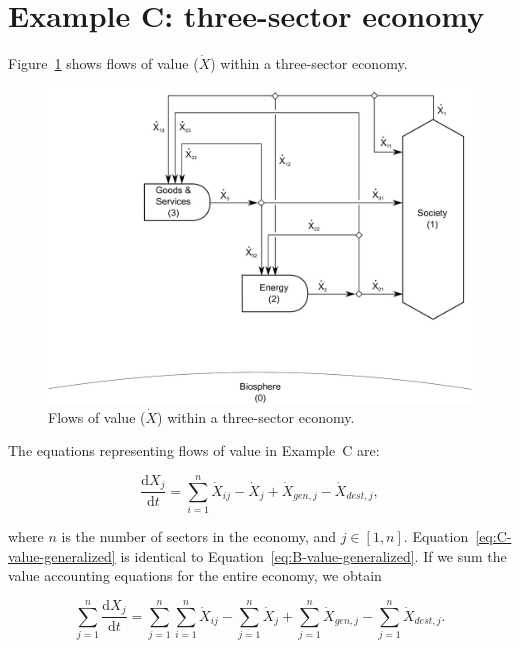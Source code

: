 \section{Example C: three-sector economy} %

Figure~\ref{fig:C_value} shows flows of value ($\dot{X}$) 
within a three-sector economy. 

\begin{figure}[!ht]
\centering
\includegraphics[width=0.8\linewidth]{Part_2/Chapter_Values/images/3_sector_value.pdf}
\caption[Flows of value within a three-sector economy.]{Flows of value ($\dot{X}$) within a three-sector economy.}
\label{fig:C_value}
\end{figure}

The equations representing flows of value in Example~C are:

\begin{equation}\label{eq:C-value-generalized}
	\frac{\mathrm{d}X_{j}}{\mathrm{d}t}
	= \sum\limits_{i=1}^{n} \dot{X}_{ij}
	- \dot{X}_{j}
	+ \dot{X}_{gen,j}
	- \dot{X}_{dest,j},
\end{equation}

\noindent{}where $n$ is the number of sectors in the economy, and $j \in [1, n]$.
Equation~\ref{eq:C-value-generalized} is identical to Equation~\ref{eq:B-value-generalized}.
If we sum the value accounting equations for the entire economy, 
we obtain

\begin{equation}\label{eq:C-value-economy-a}
	\sum\limits_{j=1}^{n} \frac{\mathrm{d}X_{j}}{\mathrm{d}t}
	= \sum\limits_{j=1}^{n} \sum\limits_{i=1}^{n} \dot{X}_{ij}
	- \sum\limits_{j=1}^{n} \dot{X}_{j}
	+ \sum\limits_{j=1}^{n} \dot{X}_{gen,j}
	- \sum\limits_{j=1}^{n} \dot{X}_{dest,j}.
\end{equation}

